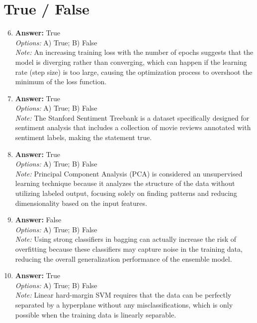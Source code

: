 \documentclass[12pt]{article}
\begin{document}
\section*{True / False}
\begin{enumerate}[label=\arabic*.]
\setcounter{enumi}{5}
\item \textbf{Answer:} True
\\ \textit{Options:} A) True; B) False
\\ \textit{Note:} An increasing training loss with the number of epochs suggests that the model is diverging rather than converging, which can happen if the learning rate (step size) is too large, causing the optimization process to overshoot the minimum of the loss function.
\item \textbf{Answer:} True
\\ \textit{Options:} A) True; B) False
\\ \textit{Note:} The Stanford Sentiment Treebank is a dataset specifically designed for sentiment analysis that includes a collection of movie reviews annotated with sentiment labels, making the statement true.
\item \textbf{Answer:} True
\\ \textit{Options:} A) True; B) False
\\ \textit{Note:} Principal Component Analysis (PCA) is considered an unsupervised learning technique because it analyzes the structure of the data without utilizing labeled output, focusing solely on finding patterns and reducing dimensionality based on the input features.
\item \textbf{Answer:} False
\\ \textit{Options:} A) True; B) False
\\ \textit{Note:} Using strong classifiers in bagging can actually increase the risk of overfitting because these classifiers may capture noise in the training data, reducing the overall generalization performance of the ensemble model.
\item \textbf{Answer:} True
\\ \textit{Options:} A) True; B) False
\\ \textit{Note:} Linear hard-margin SVM requires that the data can be perfectly separated by a hyperplane without any misclassifications, which is only possible when the training data is linearly separable.
\end{enumerate}
\end{document}
